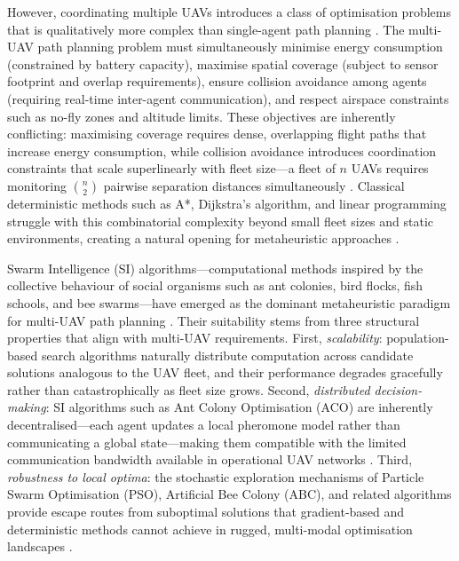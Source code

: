 \documentclass[review,3p,times]{elsarticle}
\begin{document}
However, coordinating multiple UAVs introduces a class of optimisation problems that is qualitatively more complex than single-agent path planning \cite{chung2018,gupta2016,bekmezci2013,hayat2016}. The multi-UAV path planning problem must simultaneously minimise energy consumption (constrained by battery capacity), maximise spatial coverage (subject to sensor footprint and overlap requirements), ensure collision avoidance among agents (requiring real-time inter-agent communication), and respect airspace constraints such as no-fly zones and altitude limits. These objectives are inherently conflicting: maximising coverage requires dense, overlapping flight paths that increase energy consumption, while collision avoidance introduces coordination constraints that scale superlinearly with fleet size---a fleet of $n$ UAVs requires monitoring $\binom{n}{2}$ pairwise separation distances simultaneously \cite{bekmezci2013}. Classical deterministic methods such as A*, Dijkstra's algorithm, and linear programming struggle with this combinatorial complexity beyond small fleet sizes and static environments, creating a natural opening for metaheuristic approaches \cite{aitsaadi2022}.

Swarm Intelligence (SI) algorithms---computational methods inspired by the collective behaviour of social organisms such as ant colonies, bird flocks, fish schools, and bee swarms---have emerged as the dominant metaheuristic paradigm for multi-UAV path planning \cite{dorigo2006,kennedy1995,blum2008,yang2010,beni2005,bonabeau1999,yang2013}. Their suitability stems from three structural properties that align with multi-UAV requirements. First, \textit{scalability}: population-based search algorithms naturally distribute computation across candidate solutions analogous to the UAV fleet, and their performance degrades gracefully rather than catastrophically as fleet size grows. Second, \textit{distributed decision-making}: SI algorithms such as Ant Colony Optimisation (ACO) are inherently decentralised---each agent updates a local pheromone model rather than communicating a global state---making them compatible with the limited communication bandwidth available in operational UAV networks \cite{dorigo2006,hayat2016}. Third, \textit{robustness to local optima}: the stochastic exploration mechanisms of Particle Swarm Optimisation (PSO), Artificial Bee Colony (ABC), and related algorithms provide escape routes from suboptimal solutions that gradient-based and deterministic methods cannot achieve in rugged, multi-modal optimisation landscapes \cite{kennedy1995,blum2008}.
\end{document}
